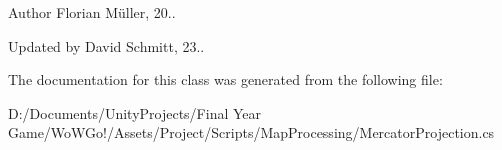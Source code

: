 \begin{DoxyAuthor}{Author}
Florian Müller, 20.. 

Updated by David Schmitt, 23..
\end{DoxyAuthor}


The documentation for this class was generated from the following file\+:\begin{DoxyCompactItemize}
\item 
D\+:/\+Documents/\+Unity\+Projects/\+Final Year Game/\+Wo\+W\+Go!/\+Assets/\+Project/\+Scripts/\+Map\+Processing/Mercator\+Projection.\+cs\end{DoxyCompactItemize}
